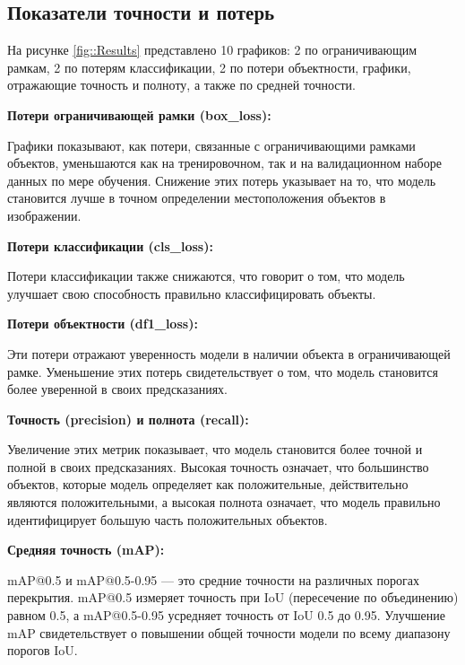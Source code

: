 \subsection{Показатели точности и потерь}

На рисунке \ref{fig::Results} представлено 10 графиков: 2 по ограничивающим рамкам, 2 по
потерям классификации, 2 по потери объектности, графики, отражающие точность и полноту, а
также по средней точности. 


\textbf{Потери ограничивающей рамки (box\_loss):}

Графики показывают, как потери, связанные с ограничивающими рамками объектов, уменьшаются как на тренировочном, так и на валидационном наборе данных по мере обучения.
Снижение этих потерь указывает на то, что модель становится лучше в точном определении местоположения объектов в изображении.

\textbf{Потери классификации (cls\_loss):}

Потери классификации также снижаются, что говорит о том, что модель улучшает свою способность правильно классифицировать объекты.

\textbf{Потери объектности (df1\_loss):}

Эти потери отражают уверенность модели в наличии объекта в ограничивающей рамке. Уменьшение этих потерь свидетельствует о том, что модель становится более уверенной в своих предсказаниях.

\textbf{Точность (precision) и полнота (recall):}

Увеличение этих метрик показывает, что модель становится более точной и полной в своих предсказаниях. Высокая точность означает, что большинство объектов, которые модель определяет как положительные, действительно являются положительными, а высокая полнота означает, что модель правильно идентифицирует большую часть положительных объектов.

\textbf{Средняя точность (mAP):}

mAP@0.5 и mAP@0.5-0.95 — это средние точности на различных порогах перекрытия. mAP@0.5 измеряет точность при IoU (пересечение по объединению) равном 0.5, а mAP@0.5-0.95 усредняет точность от IoU 0.5 до 0.95. Улучшение mAP свидетельствует о повышении общей точности модели по всему диапазону порогов IoU.

